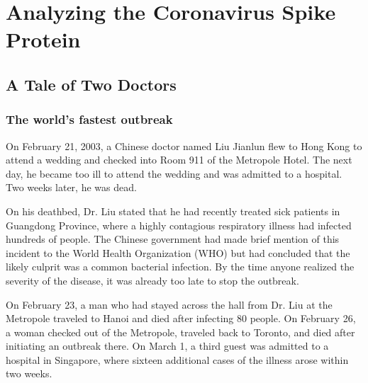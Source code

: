 \chapter[Analyzing the Coronavirus Spike Protein]{Analyzing the Coronavirus Spike Protein}
\label{chapter:coronavirus}
\renewcommand{\chaptertitle}{Analyzing the Coronavirus Spike Protein}

\FloatBarrier

%

\section{A Tale of Two Doctors}
\label{sec:coronavirus_introduction}

\FloatBarrier
{}
\subsection{The world's fastest outbreak}

On February 21, 2003, a Chinese doctor named Liu Jianlun flew to Hong Kong to attend a wedding and checked into Room 911 of the Metropole Hotel. The next day, he became too ill to attend the wedding and was admitted to a hospital. Two weeks later, he was dead.

On his deathbed, Dr. Liu stated that he had recently treated sick patients in Guangdong Province, where a highly contagious respiratory illness had infected hundreds of people. The Chinese government had made brief mention of this incident to the World Health Organization (WHO) but had concluded that the likely culprit was a common bacterial infection. By the time anyone realized the severity of the disease, it was already too late to stop the outbreak.

On February 23, a man who had stayed across the hall from Dr. Liu at the Metropole traveled to Hanoi and died after infecting 80 people. On February 26, a woman checked out of the Metropole, traveled back to Toronto, and died after initiating an outbreak there. On March 1, a third guest was admitted to a hospital in Singapore, where sixteen additional cases of the illness arose within two weeks.

